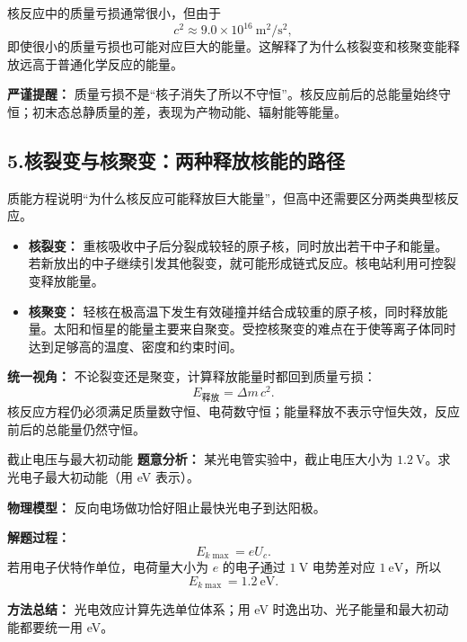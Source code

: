 核反应中的质量亏损通常很小，但由于
\[
c^2\approx9.0\times10^{16}\ \mathrm{m^2/s^2},
\]
即使很小的质量亏损也可能对应巨大的能量。这解释了为什么核裂变和核聚变能释放远高于普通化学反应的能量。

\textbf{严谨提醒：} 质量亏损不是“核子消失了所以不守恒”。核反应前后的总能量始终守恒；初末态总静质量的差，表现为产物动能、辐射能等能量。

\begin{center}


\label{fig:mass-defect-energy}
\end{center}

\subsection*{5.\quad 核裂变与核聚变：两种释放核能的路径}

质能方程说明“为什么核反应可能释放巨大能量”，但高中还需要区分两类典型核反应。

\begin{center}


\label{fig:fission-fusion-model}
\end{center}

\begin{itemize}
  \item \textbf{核裂变：} 重核吸收中子后分裂成较轻的原子核，同时放出若干中子和能量。若新放出的中子继续引发其他裂变，就可能形成链式反应。核电站利用可控裂变释放能量。
  \item \textbf{核聚变：} 轻核在极高温下发生有效碰撞并结合成较重的原子核，同时释放能量。太阳和恒星的能量主要来自聚变。受控核聚变的难点在于使等离子体同时达到足够高的温度、密度和约束时间。
\end{itemize}

\textbf{统一视角：} 不论裂变还是聚变，计算释放能量时都回到质量亏损：
\[
E_{\text{释放}}=\Delta m\,c^2.
\]
核反应方程仍必须满足质量数守恒、电荷数守恒；能量释放不表示守恒失效，反应前后的总能量仍然守恒。

\begin{examplebox}{截止电压与最大初动能}
\textbf{题意分析：} 某光电管实验中，截止电压大小为 $1.2\ \mathrm{V}$。求光电子最大初动能（用 eV 表示）。

\textbf{物理模型：} 反向电场做功恰好阻止最快光电子到达阳极。

\textbf{解题过程：}
\[
E_{k\max}=eU_c.
\]
若用电子伏特作单位，电荷量大小为 $e$ 的电子通过 $1\ \mathrm{V}$ 电势差对应 $1\ \mathrm{eV}$，所以
\[
E_{k\max}=1.2\ \mathrm{eV}.
\]

\textbf{方法总结：} 光电效应计算先选单位体系；用 eV 时逸出功、光子能量和最大初动能都要统一用 eV。
\end{examplebox}

